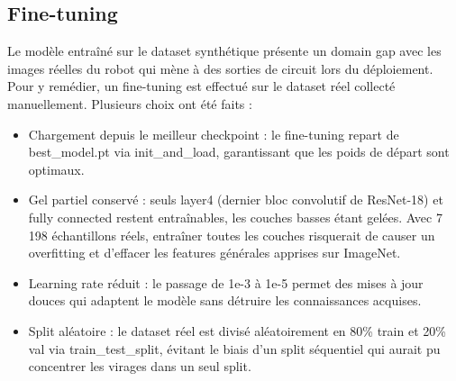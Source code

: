 \subsection{Fine-tuning}
Le modèle entraîné sur le dataset synthétique présente un domain gap avec les images réelles du robot qui mène à des sorties de circuit lors du déploiement.
Pour y remédier, un fine-tuning est effectué sur le dataset réel collecté manuellement. Plusieurs choix ont été faits :
\begin{itemize}
  \item Chargement depuis le meilleur checkpoint : le fine-tuning repart de best\_model.pt via init\_and\_load, garantissant que les poids de départ sont optimaux.
  \item Gel partiel conservé : seuls layer4 (dernier bloc convolutif de ResNet-18) et fully connected restent entraînables, les couches basses étant gelées. Avec 7 198 échantillons réels, entraîner toutes les couches risquerait de causer un overfitting et d'effacer les features générales apprises sur ImageNet.
  \item Learning rate réduit : le passage de 1e-3 à 1e-5 permet des mises à jour douces qui adaptent le modèle sans détruire les connaissances acquises. 
  \item Split aléatoire : le dataset réel est divisé aléatoirement en 80\% train et 20\% val via train\_test\_split, évitant le biais d'un split séquentiel qui aurait pu concentrer les virages dans un seul split.
\end{itemize}
